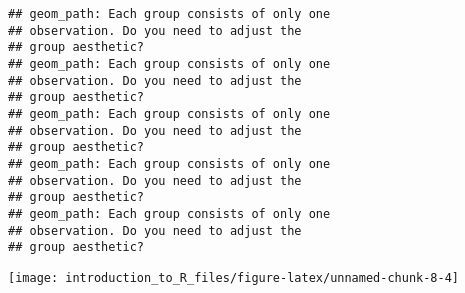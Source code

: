 \documentclass[]{tufte-handout}
\newenvironment{Shaded}{}{}
\newcommand{\CommentTok}[1]{\textcolor[rgb]{0.38,0.63,0.69}{\textit{#1}}}
\newcommand{\DataTypeTok}[1]{\textcolor[rgb]{0.56,0.13,0.00}{#1}}
\newcommand{\DecValTok}[1]{\textcolor[rgb]{0.25,0.63,0.44}{#1}}
\newcommand{\FloatTok}[1]{\textcolor[rgb]{0.25,0.63,0.44}{#1}}
\newcommand{\KeywordTok}[1]{\textcolor[rgb]{0.00,0.44,0.13}{\textbf{#1}}}
\newcommand{\NormalTok}[1]{#1}
\newcommand{\OperatorTok}[1]{\textcolor[rgb]{0.40,0.40,0.40}{#1}}
\newcommand{\StringTok}[1]{\textcolor[rgb]{0.25,0.44,0.63}{#1}}
\begin{document}
\begin{Shaded}
\end{Shaded}

\begin{verbatim}
## geom_path: Each group consists of only one
## observation. Do you need to adjust the
## group aesthetic?
## geom_path: Each group consists of only one
## observation. Do you need to adjust the
## group aesthetic?
## geom_path: Each group consists of only one
## observation. Do you need to adjust the
## group aesthetic?
## geom_path: Each group consists of only one
## observation. Do you need to adjust the
## group aesthetic?
## geom_path: Each group consists of only one
## observation. Do you need to adjust the
## group aesthetic?
\end{verbatim}

\texttt{[image: introduction\_to\_R\_files/figure-latex/unnamed-chunk-8-4]}

\begin{Shaded}
\end{Shaded}
\end{document}

